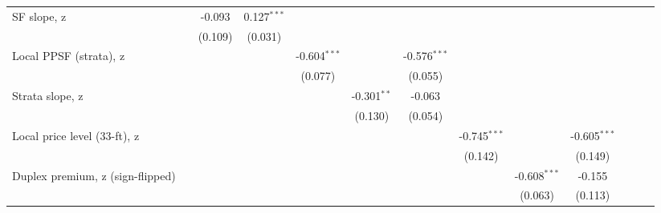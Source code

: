 \begin{table}[htbp]
\begin{tabular}{lcccccccccccc}
      SF slope, z                        &                & -0.093  & 0.127$^{***}$  &                &               &                &                &                &                &                &                &   \\   
                                         &                & (0.109) & (0.031)        &                &               &                &                &                &                &                &                &   \\   
      Local PPSF (strata), z             &                &         &                & -0.604$^{***}$ &               & -0.576$^{***}$ &                &                &                &                &                &   \\   
                                         &                &         &                & (0.077)        &               & (0.055)        &                &                &                &                &                &   \\   
      Strata slope, z                    &                &         &                &                & -0.301$^{**}$ & -0.063         &                &                &                &                &                &   \\   
                                         &                &         &                &                & (0.130)       & (0.054)        &                &                &                &                &                &   \\   
      Local price level (33-ft), z       &                &         &                &                &               &                & -0.745$^{***}$ &                & -0.605$^{***}$ &                &                &   \\   
                                         &                &         &                &                &               &                & (0.142)        &                & (0.149)        &                &                &   \\   
      Duplex premium, z (sign-flipped)   &                &         &                &                &               &                &                & -0.608$^{***}$ & -0.155         &                &                &   \\   
                                         &                &         &                &                &               &                &                & (0.063)        & (0.113)        &                &                &   \\   

\end{tabular}
\end{table}

